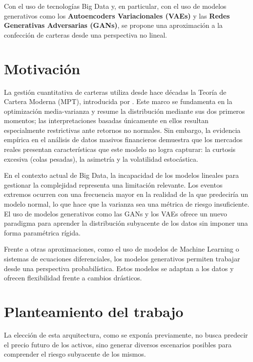 Con el uso de tecnologías Big Data y, en particular, con el uso de modelos generativos como los \textbf{Autoencoders Variacionales (VAEs)} y las \textbf{Redes Generativas Adversarias (GANs)}, se propone una aproximación a la confección de carteras desde una perspectiva no lineal.

\section{Motivación}

La gestión cuantitativa de carteras utiliza desde hace décadas la Teoría de Cartera Moderna (MPT), introducida por \cite{markowitz1952}. Este marco se fundamenta en la optimización media-varianza y resume la distribución mediante sus dos primeros momentos; las interpretaciones basadas únicamente en ellos resultan especialmente restrictivas ante retornos no normales. Sin embargo, la evidencia empírica en el análisis de datos masivos financieros demuestra que los mercados reales presentan características que este modelo no logra capturar: la curtosis excesiva (colas pesadas), la asimetría y la volatilidad estocástica.

En el contexto actual de Big Data, la incapacidad de los modelos lineales para gestionar la complejidad representa una limitación relevante. Los eventos extremos ocurren con una frecuencia mayor en la realidad de la que predeciría un modelo normal, lo que hace que la varianza sea una métrica de riesgo insuficiente. El uso de modelos generativos como las GANs \cite{NIPS2016_8a3363ab} y los VAEs \cite{kingma2013auto} ofrece un nuevo paradigma para aprender la distribución subyacente de los datos sin imponer una forma paramétrica rígida.

Frente a otras aproximaciones, como el uso de modelos de Machine Learning o sistemas de ecuaciones diferenciales, los modelos generativos permiten trabajar desde una perspectiva probabilística. Estos modelos se adaptan a los datos y ofrecen flexibilidad frente a cambios drásticos.

\section{Planteamiento del trabajo}

La elección de esta arquitectura, como se exponía previamente, no busca predecir el precio futuro de los activos, sino generar diversos escenarios posibles para comprender el riesgo subyacente de los mismos.

